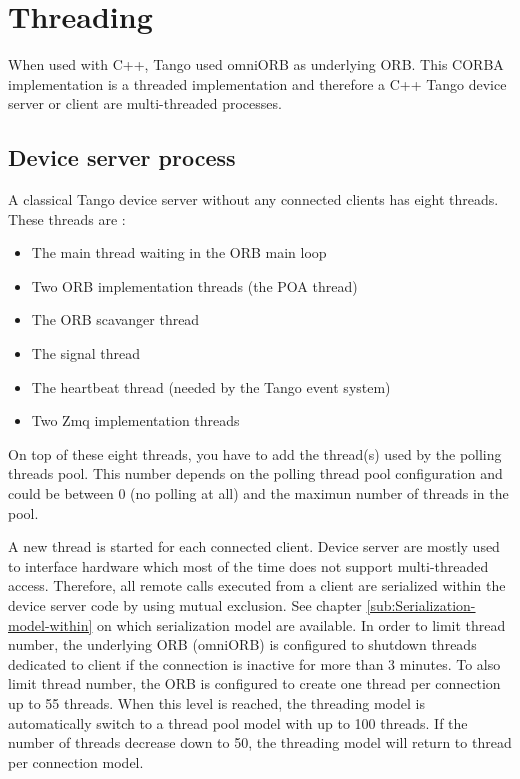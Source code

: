 \section{Threading}
\label{sec:Threading}

When used with C++, Tango used omniORB as underlying ORB. This CORBA
implementation is a threaded implementation and therefore a C++ Tango
device server or client are multi-threaded processes.


\subsection{Device server process}

A classical Tango device server without any connected clients has
eight threads. These threads are :
\begin{itemize}
\item The main thread waiting in the ORB main loop
\item Two ORB implementation threads (the POA thread)
\item The ORB scavanger thread
\item The signal thread
\item The heartbeat thread (needed by the Tango event system)
\item Two Zmq implementation threads
\end{itemize}
On top of these eight threads, you have to add the thread(s) used
by the polling threads pool. This number depends on the polling thread
pool configuration and could be between 0 (no polling at all) and
the maximun number of threads in the pool.

A new thread is started for each connected client. Device server are
mostly used to interface hardware which most of the time does not
support multi-threaded access. Therefore, all remote calls executed
from a client are serialized within the device server code by using
mutual exclusion. See chapter \ref{sub:Serialization-model-within}
on which serialization model are available. In order to limit thread
number, the underlying ORB (omniORB) is configured to shutdown threads
dedicated to client if the connection is inactive for more than 3
minutes. To also limit thread number, the ORB is configured to create
one thread per connection up to 55 threads. When this level is reached,
the threading model is automatically switch to a \textquotedbl{}thread
pool\textquotedbl{} model with up to 100 threads. If the number of
threads decrease down to 50, the threading model will return to \textquotedbl{}thread
per connection\textquotedbl{} model.


